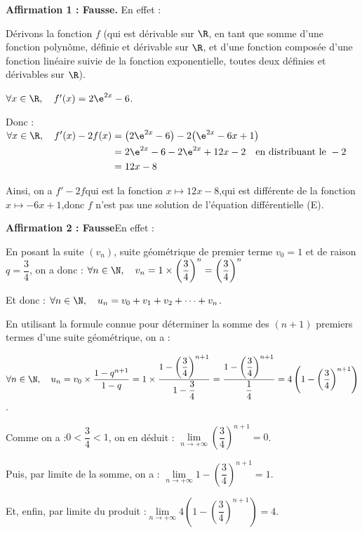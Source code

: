 
\textbf{Affirmation 1 : Fausse.}\quad
En effet :

Dérivons la fonction $f$ (qui est dérivable sur $\R$, en tant que somme d'une fonction polynôme, définie et dérivable sur $\R$, et d'une fonction composée d'une fonction linéaire suivie de la fonction exponentielle, toutes deux définies et dérivables sur $\R$).

$\forall x \in \R,\quad f'(x) = 2\e^{2x} - 6$.

Donc :\quad $\aligned[t] \forall x\in \R,\quad f'(x) - 2f(x)
	&	= \big(2\e^{2x} - 6\big) - 2\big(\e^{2x} - 6x + 1\big)\\
	&	= 2\e^{2x} - 6 - 2\e^{2x} + 12x -2 \quad\text{en distribuant le }- 2\\
	&	= 12x -8\\	\endaligned$

Ainsi, on a \quad $f' - 2f$\quad qui est la fonction \quad $x \longmapsto 12x - 8$,\quad qui est différente de la fonction \quad $x \longmapsto -6x + 1$,\quad donc $f$ n'est pas une solution de l'équation différentielle (E).

\medskip

\textbf{Affirmation 2 : Fausse}\quad 	En effet :

En posant la suite $\left(v_n\right)$, suite géométrique de premier terme $v_0 = 1$ et de raison $q = \dfrac{3}{4}$, on a donc :\quad
	$\forall n \in \N, \quad v_n = 1\times \left(\dfrac{3}{4}\right)^n = \left(\dfrac{3}{4}\right)^n$

Et donc  : \quad $\forall n \in \N,\quad u_n = v_0 + v_1 + v_2 + \dots +v_n$.

En utilisant la formule connue pour déterminer la somme des $(n+1)$ premiers termes d'une suite géométrique, on a :

$\forall n \in \N,\quad u_n = v_0 \times \dfrac{1 - q^{n+1}}{1 - q} = 1\times \dfrac{1 - \left(\dfrac{3}{4}\right)^{n+1}}{1 - \dfrac{3}{4}} = \dfrac{1 - \left(\dfrac{3}{4}\right)^{n+1}}{\dfrac{1}{4}} = 4\left(1 - \left(\dfrac{3}{4}\right)^{n+1}\right)$.

Comme on a :\quad $0< \dfrac{3}{4} < 1$, \quad on en déduit : \quad$\lim\limits_{n \to +\infty} \left(\dfrac{3}{4}\right)^{n+1} = 0$.

Puis, par limite de la somme, on a : \quad$\lim\limits_{n \to +\infty} 1 - \left(\dfrac{3}{4}\right)^{n+1} = 1$.

Et, enfin, par limite du produit :\quad$\lim\limits_{n \to +\infty} 4\left( 1-\left(\dfrac{3}{4}\right)^{n+1}\right) = 4$.

